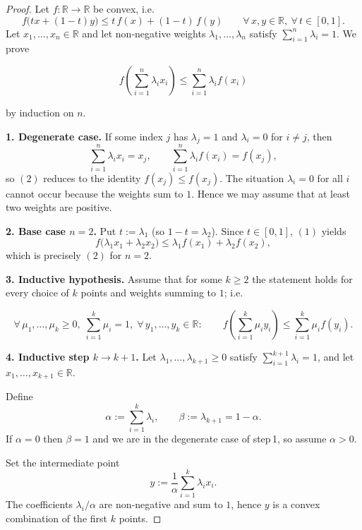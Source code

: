 \begin{proof}
Let \(f:\mathbb{R}\to\mathbb{R}\) be convex, i.e.  
\begin{equation}
f\bigl(t x+(1-t)y\bigr)\le t\,f(x)+(1-t)\,f(y)\qquad
\forall\,x,y\in\mathbb{R},\ \forall\,t\in[0,1]. \tag{1}
\end{equation}
Let \(x_{1},\dots ,x_{n}\in\mathbb{R}\) and let non‑negative weights
\(\lambda_{1},\dots ,\lambda_{n}\) satisfy \(\sum_{i=1}^{n}\lambda_{i}=1\).
We prove  

\[
f\!\left(\sum_{i=1}^{n}\lambda_{i}x_{i}\right)\le
\sum_{i=1}^{n}\lambda_{i}f(x_{i}) \tag{2}
\]

by induction on \(n\).

\medskip\noindent\textbf{1. Degenerate case.}  
If some index \(j\) has \(\lambda_{j}=1\) and \(\lambda_{i}=0\) for \(i\neq j\), then
\[
\sum_{i=1}^{n}\lambda_{i}x_{i}=x_{j},\qquad
\sum_{i=1}^{n}\lambda_{i}f(x_{i})=f(x_{j}),
\]
so \((2)\) reduces to the identity \(f(x_{j})\le f(x_{j})\).  
The situation \(\lambda_{i}=0\) for all \(i\) cannot occur because the weights sum to
\(1\). Hence we may assume that at least two weights are positive.

\medskip\noindent\textbf{2. Base case \(n=2\).}  
Put \(t:=\lambda_{1}\) (so \(1-t=\lambda_{2}\)).  Since \(t\in[0,1]\), \((1)\) yields
\[
f\bigl(\lambda_{1}x_{1}+\lambda_{2}x_{2}\bigr)
   \le \lambda_{1}f(x_{1})+\lambda_{2}f(x_{2}),
\]
which is precisely \((2)\) for \(n=2\).

\medskip\noindent\textbf{3. Inductive hypothesis.}  
Assume that for some \(k\ge 2\) the statement holds for every choice of
\(k\) points and weights summing to \(1\); i.e.

\[
\forall\,\mu_{1},\dots ,\mu_{k}\ge 0,\;
\sum_{i=1}^{k}\mu_{i}=1,\;
\forall\,y_{1},\dots ,y_{k}\in\mathbb{R}:
\qquad
f\!\left(\sum_{i=1}^{k}\mu_{i}y_{i}\right)
      \le\sum_{i=1}^{k}\mu_{i}f(y_{i}). \tag{IH}
\]

\medskip\noindent\textbf{4. Inductive step \(k\to k+1\).}  
Let \(\lambda_{1},\dots ,\lambda_{k+1}\ge 0\) satisfy \(\sum_{i=1}^{k+1}\lambda_{i}=1\),
and let \(x_{1},\dots ,x_{k+1}\in\mathbb{R}\).

Define
\[
\alpha:=\sum_{i=1}^{k}\lambda_{i},\qquad
\beta :=\lambda_{k+1}=1-\alpha .
\]
If \(\alpha=0\) then \(\beta=1\) and we are in the degenerate case of step 1,
so assume \(\alpha>0\).

Set the intermediate point
\[
y:=\frac{1}{\alpha}\sum_{i=1}^{k}\lambda_{i}x_{i}.
\]
The coefficients \(\lambda_{i}/\alpha\) are non‑negative and sum to \(1\), hence
\(y\) is a convex combination of the first \(k\) points.


\end{proof}

